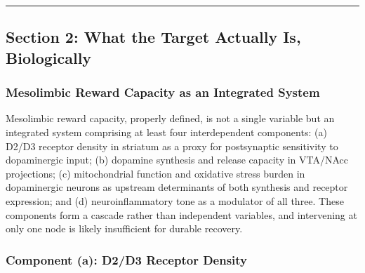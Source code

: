 \begin{center}\rule{0.5\linewidth}{0.5pt}\end{center}

\subsection{Section 2: What the Target Actually Is, Biologically}\label{18_restoration-section-2-what-the-target-actually-is-biologically}

\subsubsection{Mesolimbic Reward Capacity as an Integrated System}\label{18_restoration-mesolimbic-reward-capacity-as-an-integrated-system}

Mesolimbic reward capacity, properly defined, is not a single variable but an integrated system comprising at least four interdependent components: (a) D2/D3 receptor density in striatum as a proxy for postsynaptic sensitivity to dopaminergic input; (b) dopamine synthesis and release capacity in VTA/NAcc projections; (c) mitochondrial function and oxidative stress burden in dopaminergic neurons as upstream determinants of both synthesis and receptor expression; and (d) neuroinflammatory tone as a modulator of all three. These components form a cascade rather than independent variables, and intervening at only one node is likely insufficient for durable recovery.

\subsubsection{Component (a): D2/D3 Receptor Density}\label{18_restoration-component-a-d2d3-receptor-density}

